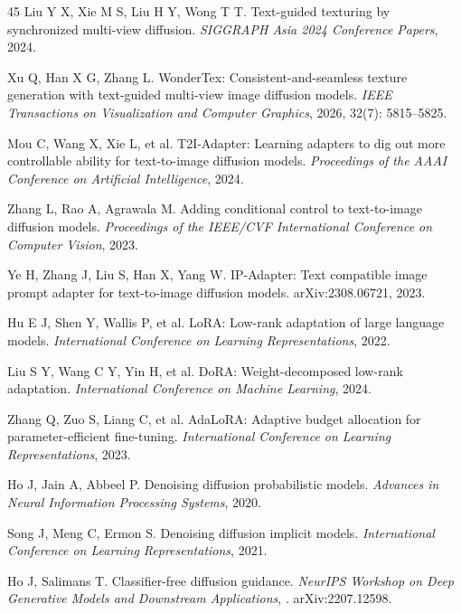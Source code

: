 \documentclass[times,twocolumn,final]{elsarticle}
\providecommand{\DIFadd}[1]{{\protect\color{blue} \sf #1}} %
\providecommand{\DIFaddbegin}{} %
\providecommand{\DIFaddend}{} %
\newcommand{\DIFaddincludegraphics}[2][]{{\color{blue}\fbox{\DIFOincludegraphics[#1]{#2}}}} %
\DeclareRobustCommand{\DIFaddbegin}{\DIFOaddbegin \let\includegraphics\DIFaddincludegraphics} %
\DeclareRobustCommand{\DIFaddend}{\DIFOaddend \let\includegraphics\DIFOincludegraphics} %
\begin{document}
\begin{thebibliography}{45}
\DIFadd{Liu Y X, Xie M S, Liu H Y, Wong T T. Text-guided texturing by synchronized multi-view diffusion. \textit{SIGGRAPH Asia 2024 Conference Papers}, 2024.
}

\DIFadd{Xu Q, Han X G, Zhang L. WonderTex: Consistent-and-seamless texture generation with text-guided multi-view image diffusion models. \textit{IEEE Transactions on Visualization and Computer Graphics}, 2026, 32(7): 5815--5825.
}

\DIFadd{Mou C, Wang X, Xie L, et al. T2I-Adapter: Learning adapters to dig out more controllable ability for text-to-image diffusion models. \textit{Proceedings of the AAAI Conference on Artificial Intelligence}, 2024.
}

\DIFaddend {}
Zhang L, Rao A, Agrawala M. Adding conditional control to text-to-image diffusion models. \textit{Proceedings of the IEEE/CVF International Conference on Computer Vision}, 2023.

Ye H, Zhang J, Liu S, Han X, Yang W. IP-Adapter: Text compatible image prompt adapter for text-to-image diffusion models. arXiv:2308.06721, 2023.

Hu E J, Shen Y, Wallis P, et al. LoRA: Low-rank adaptation of large language models. \textit{International Conference on Learning Representations}, 2022.

Liu S Y, Wang C Y, Yin H, et al. DoRA: Weight-decomposed low-rank adaptation.   \DIFaddbegin \DIFadd{\textit{International Conference on Machine Learning}}\DIFaddend , 2024.

Zhang Q, Zuo S, Liang C, et al. AdaLoRA: Adaptive budget allocation for parameter-efficient fine-tuning. \textit{International Conference on Learning Representations}, 2023.

Ho J, Jain A, Abbeel P. Denoising diffusion probabilistic models. \textit{Advances in Neural Information Processing Systems}, 2020.

Song J, Meng C, Ermon S. Denoising diffusion implicit models. \textit{International Conference on Learning Representations}, 2021.

Ho J, Salimans T. Classifier-free diffusion guidance. \textit{NeurIPS Workshop \DIFaddbegin \DIFadd{on Deep Generative Models and Downstream Applications}\DIFaddend },   \DIFaddbegin \DIFadd{2021. arXiv:2207.12598.
}\DIFaddend


\end{thebibliography}
\end{document}
